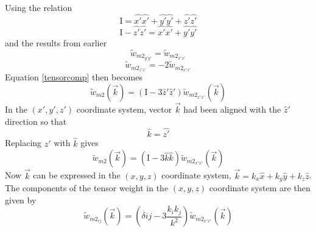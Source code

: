 \documentclass[double,12pt]{beavtex}
\begin{document}
\noindent Using the relation
\begin{displaymath}{\text{I} = \hat{x'}\hat{x'} + \hat{y'}\hat{y'} + \hat{z'}\hat{z'}}\end{displaymath}
\begin{displaymath}{\text{I} -\hat{z'}\hat{z'} = \hat{x'}\hat{x'} + \hat{y'}\hat{y'}}\end{displaymath}
and the results from earlier
\begin{equation}{\widetilde{w}_{{m2}_{y'y'}}=\widetilde{w}_{{m2}_{x'x'}}}\end{equation}
\begin{equation}{\widetilde{w}_{{m2}_{z'z'}}=-2\widetilde{w}_{{m2}_{x'x'}}}\end{equation}
Equation \ref{tensorcomp} then becomes 
\begin{equation}{\widetilde{w}_{m2}(\vec{k})= (\text{I}-3\hat{z}'\hat{z}')\widetilde{w}_{{m2}_{x'x'}}(\vec{k})}\end{equation}
\noindent In the $(x',y',z')$ coordinate system, vector $\vec{k}$ had been aligned with the $\hat{z}'$ direction so that 
\begin{displaymath}{\hat{k}=\hat{z'}}\end{displaymath}
Replacing $\hat{z}'$ with $\hat{k}$ gives
\begin{equation}{\widetilde{w}_{m2}(\vec{k})= (\text{I}-3\hat{k}\hat{k})\widetilde{w}_{{m2}_{x'x'}}(\vec{k})}\end{equation}
Now  $\vec{k}$ can be expressed in the $(x,y,z)$ coordinate system, $\vec{k}=k_x\hat{x} + k_y\hat{y} + k_z\hat{z}$. The components of the tensor weight in the $(x,y,z)$ coordinate system are then given by
\begin{equation}{\widetilde{w}_{m2_{ij}}(\vec{k})= (\delta{ij}-3\frac{k_ik_j}{k^2})\widetilde{w}_{{m2}_{x'x'}}(\vec{k})}\end{equation}
\end{document}
